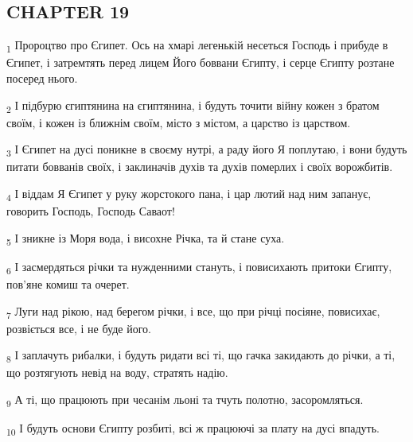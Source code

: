 \subsection{CHAPTER 19}
\begin{tcolorbox}
\textsubscript{1} Пророцтво про Єгипет. Ось на хмарі легенькій несеться Господь і прибуде в Єгипет, і затремтять перед лицем Його боввани Єгипту, і серце Єгипту розтане посеред нього.
\end{tcolorbox}
\begin{tcolorbox}
\textsubscript{2} І підбурю єгиптянина на єгиптянина, і будуть точити війну кожен з братом своїм, і кожен із ближнім своїм, місто з містом, а царство із царством.
\end{tcolorbox}
\begin{tcolorbox}
\textsubscript{3} І Єгипет на дусі поникне в своєму нутрі, а раду його Я поплутаю, і вони будуть питати бовванів своїх, і заклиначів духів та духів померлих і своїх ворожбитів.
\end{tcolorbox}
\begin{tcolorbox}
\textsubscript{4} І віддам Я Єгипет у руку жорстокого пана, і цар лютий над ним запанує, говорить Господь, Господь Саваот!
\end{tcolorbox}
\begin{tcolorbox}
\textsubscript{5} І зникне із Моря вода, і висохне Річка, та й стане суха.
\end{tcolorbox}
\begin{tcolorbox}
\textsubscript{6} І засмердяться річки та нужденними стануть, і повисихають притоки Єгипту, пов'яне комиш та очерет.
\end{tcolorbox}
\begin{tcolorbox}
\textsubscript{7} Луги над рікою, над берегом річки, і все, що при річці посіяне, повисихає, розвіється все, і не буде його.
\end{tcolorbox}
\begin{tcolorbox}
\textsubscript{8} І заплачуть рибалки, і будуть ридати всі ті, що гачка закидають до річки, а ті, що розтягують невід на воду, стратять надію.
\end{tcolorbox}
\begin{tcolorbox}
\textsubscript{9} А ті, що працюють при чесанім льоні та тчуть полотно, засоромляться.
\end{tcolorbox}
\begin{tcolorbox}
\textsubscript{10} І будуть основи Єгипту розбиті, всі ж працюючі за плату на дусі впадуть.
\end{tcolorbox}
